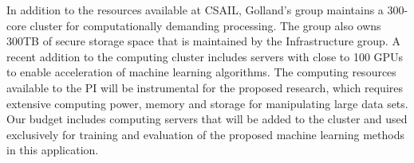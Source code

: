 \documentclass[11pt]{amsart}
\begin{document}
In addition to the resources available at CSAIL, Golland’s group maintains a 300-core cluster for computationally demanding processing. The group also owns 300TB of secure storage space that is maintained by the Infrastructure group. A recent addition to the computing cluster includes servers with close to 100 GPUs to enable acceleration of machine learning algorithms. The computing resources available to the PI will be instrumental for the proposed research, which requires extensive computing power, memory and storage for manipulating large data sets. Our budget includes computing servers that will be added to the cluster and used exclusively for training and evaluation of the proposed machine learning methods in this application.
\end{document}
